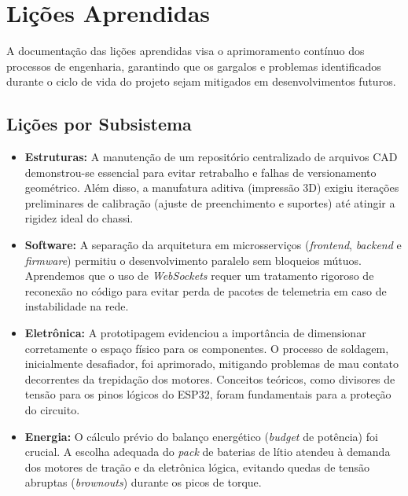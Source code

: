 \chapter{Lições Aprendidas}
\vspace{-1cm}

A documentação das lições aprendidas visa o aprimoramento contínuo dos processos de engenharia, garantindo que os gargalos e problemas identificados durante o ciclo de vida do projeto sejam mitigados em desenvolvimentos futuros.

\section{Lições por Subsistema}

\begin{itemize}
    \item \textbf{Estruturas:} A manutenção de um repositório centralizado de arquivos CAD demonstrou-se essencial para evitar retrabalho e falhas de versionamento geométrico. Além disso, a manufatura aditiva (impressão 3D) exigiu iterações preliminares de calibração (ajuste de preenchimento e suportes) até atingir a rigidez ideal do chassi.
    
    \item \textbf{Software:} A separação da arquitetura em microsserviços (\textit{frontend}, \textit{backend} e \textit{firmware}) permitiu o desenvolvimento paralelo sem bloqueios mútuos. Aprendemos que o uso de \textit{WebSockets} requer um tratamento rigoroso de reconexão no código para evitar perda de pacotes de telemetria em caso de instabilidade na rede.
    
    \item \textbf{Eletrônica:} A prototipagem evidenciou a importância de dimensionar corretamente o espaço físico para os componentes. O processo de soldagem, inicialmente desafiador, foi aprimorado, mitigando problemas de mau contato decorrentes da trepidação dos motores. Conceitos teóricos, como divisores de tensão para os pinos lógicos do ESP32, foram fundamentais para a proteção do circuito.
    
    \item \textbf{Energia:} O cálculo prévio do balanço energético (\textit{budget} de potência) foi crucial. A escolha adequada do \textit{pack} de baterias de lítio atendeu à demanda dos motores de tração e da eletrônica lógica, evitando quedas de tensão abruptas (\textit{brownouts}) durante os picos de torque.
\end{itemize}

